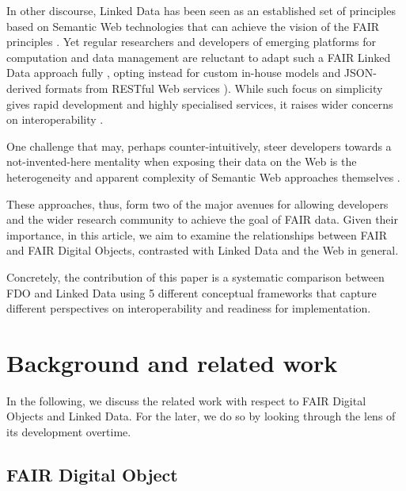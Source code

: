 \documentclass[fleqn,10pt,lineno]{wlpeerjlua}
\begin{document}
In other discourse, Linked Data \autocite{bizerLinkedDataStory2009a} has been seen as an established set of principles based on Semantic Web technologies that can achieve the vision of the FAIR principles \autocite{boninodasilvasantosFAIRDataPoints2016a,hasnainAssessingFAIRData2018a}. Yet regular researchers and developers of emerging platforms for computation and data management are reluctant to adapt such a FAIR Linked Data approach fully \autocite{verborghSemanticWebIdentity2020a}, opting instead for custom in-house models and JSON-derived formats from RESTful Web services \autocite{merono-penuelaConclusionFutureChallenges2021a,neumannAnalysisPublicREST2021a}). While such focus on simplicity gives rapid development and highly specialised services, it raises wider concerns on interoperability \autocite{turcoaneLinkedDataJSONLD2014a,wilkinsonWorkflowsWhenParts2022b}.

One challenge that may, perhaps counter-intuitively, steer developers towards a not-invented-here mentality \autocite{stefiDevelopersMakeUnbiased2015,stefiDevelopReuseTwo2015a} when exposing their data on the Web is the heterogeneity and apparent complexity of Semantic Web approaches themselves \autocite{merono-penuelaWebDataApis2021b}.

These approaches, thus, form two of the major avenues for allowing developers and the wider research community to achieve the goal of FAIR data. Given their importance, in this article, we aim to examine the relationships between FAIR and FAIR Digital Objects, contrasted with Linked Data and the Web in general.

Concretely, the contribution of this paper is a systematic comparison between FDO and Linked Data using 5 different conceptual frameworks that capture different perspectives on interoperability and readiness for implementation.

\hypertarget{sec:background}{%
\section*{Background and related work}\label{sec:background}}

In the following, we discuss the related work with respect to FAIR Digital Objects and Linked Data. For the later, we do so by looking through the lens of its development overtime.

\hypertarget{sec:fdo}{%
\subsection*{FAIR Digital Object}\label{sec:fdo}}
\end{document}
